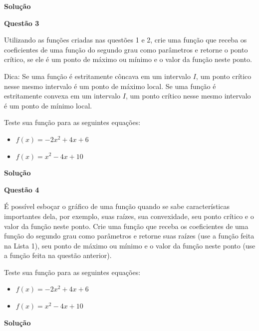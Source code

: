 \documentclass[12pt, a4paper]{article}
\begin{document}
\textbf{Solução}





\textbf{Questão 3}

Utilizando as funções criadas nas questões 1 e 2, crie uma função que receba os coeficientes de uma função do segundo grau como parâmetros e retorne o ponto crítico, se ele é um ponto de máximo ou mínimo e o valor da função neste ponto. 

Dica: Se uma função é estritamente côncava em um intervalo $I$, um ponto crítico nesse mesmo intervalo é um ponto de máximo local. Se uma função é estritamente convexa em um intervalo $I$, um ponto crítico nesse mesmo intervalo é um ponto de mínimo local.

Teste sua função para as seguintes equações:

\begin{itemize}
	\item $f(x) = -2x^2 + 4x + 6$
	\item $f(x) = x^2 - 4x + 10$
\end{itemize}



\textbf{Solução}





\textbf{Questão 4}

É possível esboçar o gráfico de uma função quando se sabe características importantes dela, por exemplo, suas raízes, sua convexidade, seu ponto crítico e o valor da função neste ponto. Crie uma função que receba os coeficientes de uma função do segundo grau como parâmetros e retorne suas raízes (use a função feita na Lista 1), seu ponto de máximo ou mínimo e o valor da função neste ponto (use a função feita na questão anterior).

Teste sua função para as seguintes equações:

\begin{itemize}
	\item $f(x) = -2x^2 + 4x + 6$
	\item $f(x) = x^2 - 4x + 10$
\end{itemize}



\textbf{Solução}




	
\end{document}
